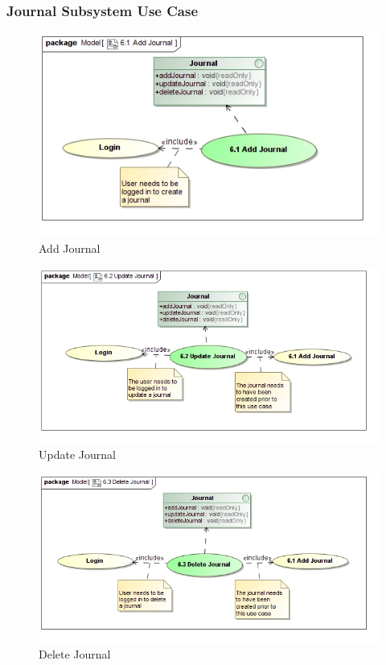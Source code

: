 \documentclass{article}
\begin{document}
			\subsubsection{Journal Subsystem Use Case}
				\begin{figure}
					\includegraphics[width=\textwidth]{5.3-SS5-7/Add-Journal}
					\caption{Add Journal}
				\end{figure}
				\begin{figure}
					\includegraphics[width=\textwidth]{5.3-SS5-7/Update-Journal}
					\caption{Update Journal}
				\end{figure}
				\begin{figure}
					\includegraphics[width=\textwidth]{5.3-SS5-7/Delete-Journal}
					\caption{Delete Journal}
				\end{figure}
\end{document}
